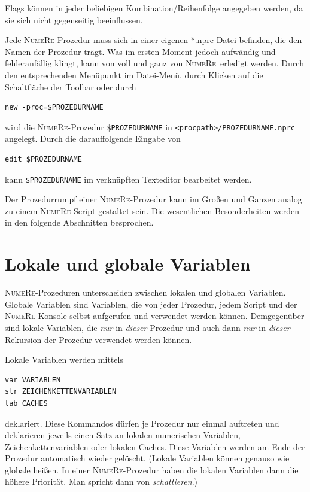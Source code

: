 \documentclass[DIV=14,headsepline,footsepline]{scrbook}
\newcommand{\NR}{\textsc{Nu\-me\-Re}}
\begin{document}
				Flags können in jeder beliebigen Kombination/Reihenfolge angegeben werden, da sie sich nicht gegenseitig beeinflussen.
				
				Jede \NR-Prozedur muss sich in einer eigenen *.nprc-Datei befinden, die den Namen der Prozedur trägt. Was im ersten Moment jedoch aufwändig und fehleranfällig klingt, kann von voll und ganz von \NR\ erledigt werden. Durch den entsprechenden Menüpunkt im Datei-Menü, durch Klicken auf die Schaltfläche der Toolbar oder durch
				\begin{lstlisting}
new -proc=$PROZEDURNAME
				\end{lstlisting}
				wird die \NR-Prozedur \lstinline+$PROZEDURNAME+ in \verb+<procpath>/PROZEDURNAME.nprc+ angelegt. Durch die darauffolgende Eingabe von
				\begin{lstlisting}
edit $PROZEDURNAME
				\end{lstlisting}
				kann \lstinline+$PROZEDURNAME+ im verknüpften Texteditor bearbeitet werden.
				
				Der Prozedurrumpf einer \NR-Prozedur kann im Großen und Ganzen analog zu einem \NR-Script gestaltet sein. Die wesentlichen Besonderheiten werden in den folgende Abschnitten besprochen.
			\section{Lokale und globale Variablen}
				\NR-Prozeduren unterscheiden zwischen lokalen und globalen Variablen. Globale Variablen sind Variablen, die von jeder Prozedur, jedem Script und der \NR-Konsole selbst aufgerufen und verwendet werden können. Demgegenüber sind lokale Variablen, die \emph{nur} in \emph{dieser} Prozedur und auch dann \emph{nur} in \emph{dieser} Rekursion der Prozedur verwendet werden können.
				
				Lokale Variablen werden mittels
				\begin{lstlisting}
var VARIABLEN
str ZEICHENKETTENVARIABLEN
tab CACHES
				\end{lstlisting}
				deklariert. Diese Kommandos dürfen je Prozedur nur einmal auftreten und deklarieren jeweils einen Satz an lokalen numerischen Variablen, Zeichenkettenvariablen oder lokalen Caches. Diese Variablen werden am Ende der Prozedur automatisch wieder gelöscht. (Lokale Variablen können genauso wie globale heißen. In einer \NR-Prozedur haben die lokalen Variablen dann die höhere Priorität. Man spricht dann von \emph{schattieren}.)
\end{document}
